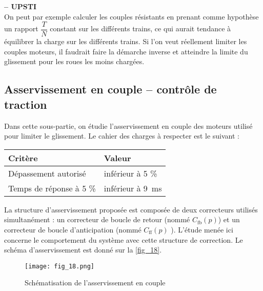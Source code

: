 \ifprof
\begin{corrige}\textbf{ -- UPSTI}\\ 
On peut par exemple calculer les couples résistants en prenant comme hypothèse un rapport $\dfrac{T}{N}$ constant sur les différents trains, ce qui aurait tendance à équilibrer la charge sur les différents trains.
Si l’on veut réellement limiter les couples moteurs, il faudrait faire la démarche inverse et atteindre la limite du glissement pour les roues les moins chargées.

\end{corrige}
\else
\fi


\subsection{Asservissement en couple – contrôle de traction}

\begin{obj}
Dans cette sous-partie, on étudie l’asservissement en couple des moteurs utilisé pour
limiter le glissement. Le cahier des charges à respecter est le suivant :

\begin{center}
\begin{tabular}{ll}
\hline
\textbf{Critère} & \textbf{Valeur} \\ \hline 
Dépassement autorisé & inférieur à 5 \% \\ 
Temps de réponse à 5 \% & inférieur à \SI{9}{ms} \\ \hline
\end{tabular}
\end{center}

\end{obj}


La structure d’asservissement proposée est composée de deux correcteurs utilisés simultanément :
un correcteur de boucle de retour (nommé $C_{\text{fb}}( p)$) et un correcteur de boucle d'anticipation
(nommé $C_{\text{ff}}( p)$ ). L’étude menée ici concerne le comportement du système avec cette structure
de correction.
Le schéma d'asservissement est donné sur la \autoref{fig_18}.

\begin{figure}[H]
\centering
\texttt{[image: fig\_18.png]}
\caption{Schématisation de l'asservissement en couple \label{fig_18}}
\end{figure}


